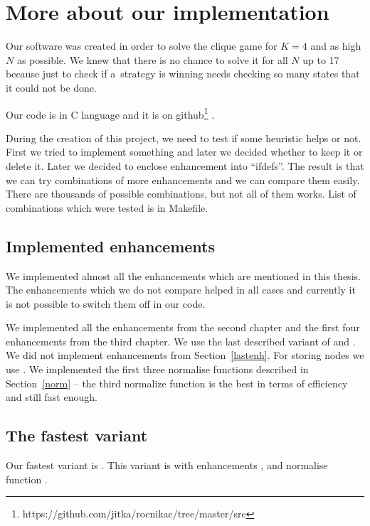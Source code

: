 \section{More about our implementation}

Our software was created in order to solve the clique game for $K=4$ and as high
$N$ as possible. We knew that there is no chance to solve it for all $N$ up
to 17 because just to check if a~strategy is winning needs checking so many
states that it could not be done. 
 
Our code is in C language and it is on
github\footnote{https://github.com/jitka/rocnikac/tree/master/src}
.

During the creation of this project, we need to test if some heuristic helps or
not. First we tried to implement something and later we decided whether to
keep it or delete it. Later we decided to enclose enhancement into ``ifdefs''.
The result is that we can try combinations of more enhancements and we can
compare them easily. There are thousands of possible combinations, but not all
of them works. List of combinations which were tested is in Makefile. 

\subsection{Implemented enhancements}

We implemented almost all the enhancements which are mentioned in this thesis. 
The enhancements which we do not compare helped in all cases and currently it is
not possible to switch them off in our code.

We implemented all the enhancements from the second chapter and the first four
enhancements from the third chapter. We use the last described variant of
 and . We did not implement
enhancements  from
Section~\ref{lastenh}. For storing nodes we use .
We implemented the first three normalise functions described in Section~\ref{norm} --
the third normalize function  is the best
in terms of efficiency and still fast enough.

\subsection{The fastest variant}

Our fastest variant is . This  variant is 
with enhancements ,  and normalise function
.

